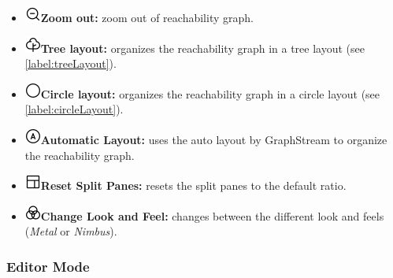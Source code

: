 \documentclass[10pt, a4paper]{article}
\begin{document}
\begin{itemize}
\item\includegraphics[scale=0.4]{../resources/images/Toolbar/zoom-out.png}\hspace{0.1cm}\textbf{Zoom out:} zoom out of reachability graph.
\item\includegraphics[scale=0.4]{../resources/images/Toolbar/tree-layout.png}\hspace{0.1cm}\textbf{Tree layout:} organizes the reachability graph in a tree layout (see \ref{label:treeLayout}).
\item\includegraphics[scale=0.4]{../resources/images/Toolbar/circle-layout.png}\hspace{0.1cm}\textbf{Circle layout:} organizes the reachability graph in a circle layout (see \ref{label:circleLayout}).
\item\includegraphics[scale=0.4]{../resources/images/Toolbar/auto-layout.png}\hspace{0.1cm}\textbf{Automatic Layout:} uses the auto layout by GraphStream to organize the reachability graph.
\item\includegraphics[scale=0.4]{../resources/images/Toolbar/layout.png}\hspace{0.1cm}\textbf{Reset Split Panes:} resets the split panes to the default ratio.
\item\includegraphics[scale=0.4]{../resources/images/Toolbar/design.png}\hspace{0.1cm}\textbf{Change Look and Feel:} changes between the different look and feels (\textit{Metal} or \textit{Nimbus}).
\end{itemize} 

\subsubsection{Editor Mode}
\label{label:editor}
\end{document}
